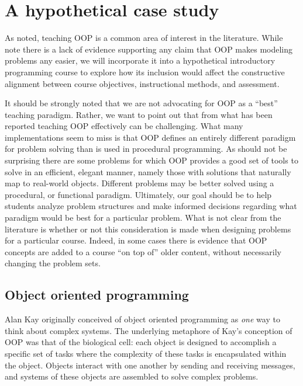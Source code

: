 \documentclass[12pt]{article}
\begin{document}
\section{A hypothetical case study}
As noted, teaching OOP is a common area of interest in the
literature. While \citeauthor{robins_learning_2003} note there is a
lack of evidence supporting any claim that OOP makes modeling problems
any easier\autocite{robins_learning_2003}, we will incorporate it into
a hypothetical introductory programming course to explore how its
inclusion would affect the constructive alignment between course
objectives, instructional methods, and assessment.

It should be strongly noted that we are not advocating for OOP as a
``best'' teaching paradigm. Rather, we want to point out that from
what has been reported teaching OOP effectively can be
challenging. What many implementations seem to miss is that OOP
defines an entirely different paradigm for problem solving than is
used in procedural programming\autocite{kolling_problem_1999}. As
should not be surprising there are some problems for which OOP
provides a good set of tools to solve in an efficient, elegant manner,
namely those with solutions that naturally map to real-world
objects\autocite{raymond_art_2003}. Different problems may be better
solved using a procedural, or functional
paradigm\autocite{kay_history_1996,felleisen_functional_2009,crestani_experience_2010}. Ultimately,
our goal should be to help students analyze problem structures and
make informed decisions regarding what paradigm would be best for a
particular problem. What is not clear from the literature is whether
or not this consideration is made when designing problems for a
particular course. Indeed, in some cases there is evidence that OOP
concepts are added to a course ``on top of'' older content, without
necessarily changing the problem
sets\autocite{kolling_problem_1999,vilner_fundamental_2007}.

\subsection{Object oriented programming}

Alan Kay originally conceived of object oriented programming as
\emph{one} way to think about complex
systems\autocite{kay_history_1996}. The underlying metaphore of Kay's
conception of OOP was that of the biological cell: each object is
designed to accomplish a specific set of tasks where the complexity of
these tasks is encapsulated within the object. Objects interact with
one another by sending and receiving messages, and systems of these
objects are assembled to solve complex
problems\autocite{kay_history_1996}.
\end{document}
